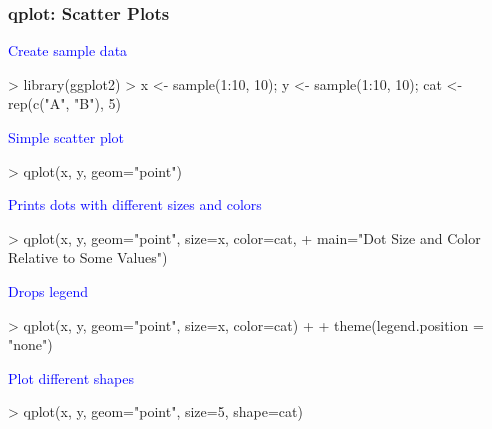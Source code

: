 \documentclass{beamer}
\begin{document}
\begin{frame}[containsverbatim]  
	\frametitle{qplot: Scatter Plots}
\vspace{0cm}
\scriptsize 
\textcolor{blue}{Create sample data}
\begin{Schunk}
\begin{Sinput}
> library(ggplot2)
> x <- sample(1:10, 10); y <- sample(1:10, 10); cat <- rep(c("A", "B"), 5)
\end{Sinput}
\end{Schunk}
\textcolor{blue}{Simple scatter plot}
\begin{Schunk}
\begin{Sinput}
> qplot(x, y, geom="point")
\end{Sinput}
\end{Schunk}
\textcolor{blue}{Prints dots with different sizes and colors}
\begin{Schunk}
\begin{Sinput}
> qplot(x, y, geom="point", size=x, color=cat, 
+       main="Dot Size and Color Relative to Some Values")
\end{Sinput}
\end{Schunk}
\textcolor{blue}{Drops legend}
\begin{Schunk}
\begin{Sinput}
> qplot(x, y, geom="point", size=x, color=cat) + 
+       theme(legend.position = "none")
\end{Sinput}
\end{Schunk}
\textcolor{blue}{Plot different shapes}
\begin{Schunk}
\begin{Sinput}
> qplot(x, y, geom="point", size=5, shape=cat)
\end{Sinput}
\end{Schunk}
\end{frame}
\end{document}

